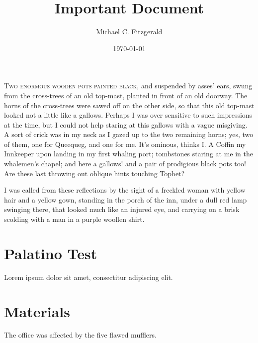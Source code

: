 \documentclass[11pt]{article}
\begin{document}
\title{Important Document}
\author{Michael C. Fitzgerald}
\date{\today}
\maketitle

\lettrine[lines=3,slope=0pt,findent=3pt,nindent=0pt]{T}{wo enormous wooden pots painted black}, and suspended by asses' ears, swung from the cross-trees of an old top-mast, planted in front of an old doorway. The horns of the cross-trees were sawed off on the other side, so that this old top-mast looked not a little like a gallows. Perhaps I was over sensitive to such impressions at the time, but I could not help staring at this gallows with a vague misgiving. A sort of crick was in my neck as I gazed up to the two remaining horns; yes, two of them, one for Queequeg, and one for me. It's ominous, thinks I. A Coffin my Innkeeper upon landing in my first whaling port; tombstones staring at me in the whalemen's chapel; and here a gallows! and a pair of prodigious black pots too! Are these last throwing out oblique hints touching Tophet? 

I was called from these reflections by the sight of a freckled woman with yellow hair and a yellow gown, standing in the porch of the inn, under a dull red lamp swinging there, that looked much like an injured eye, and carrying on a brisk scolding with a man in a purple woollen shirt.

\section*{Palatino Test}
\renewcommand*\rmdefault{ppl}
Lorem ipsum dolor sit amet, consectitur adipiscing elit.


\section*{Materials}
The office was affected by the five flawed mufflers.

\alpha \beta \gamma
\end{document}

